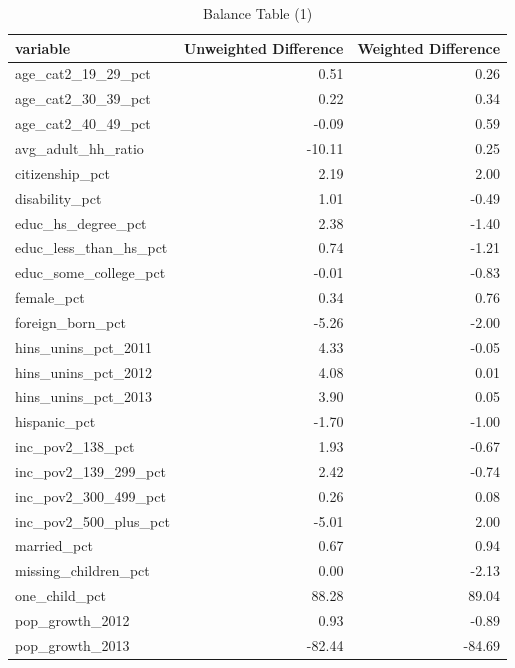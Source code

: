 \documentclass[12pt]{article}
\begin{document}
\begin{table}[ht]
\centering
\begin{tabular}{lrr}
  \hline
variable & Unweighted Difference & Weighted Difference \\ 
  \hline
age\_cat2\_19\_29\_pct & 0.51 & 0.26 \\ 
  age\_cat2\_30\_39\_pct & 0.22 & 0.34 \\ 
  age\_cat2\_40\_49\_pct & -0.09 & 0.59 \\ 
  avg\_adult\_hh\_ratio & -10.11 & 0.25 \\ 
  citizenship\_pct & 2.19 & 2.00 \\ 
  disability\_pct & 1.01 & -0.49 \\ 
  educ\_hs\_degree\_pct & 2.38 & -1.40 \\ 
  educ\_less\_than\_hs\_pct & 0.74 & -1.21 \\ 
  educ\_some\_college\_pct & -0.01 & -0.83 \\ 
  female\_pct & 0.34 & 0.76 \\ 
  foreign\_born\_pct & -5.26 & -2.00 \\ 
  hins\_unins\_pct\_2011 & 4.33 & -0.05 \\ 
  hins\_unins\_pct\_2012 & 4.08 & 0.01 \\ 
  hins\_unins\_pct\_2013 & 3.90 & 0.05 \\ 
  hispanic\_pct & -1.70 & -1.00 \\ 
  inc\_pov2\_138\_pct & 1.93 & -0.67 \\ 
  inc\_pov2\_139\_299\_pct & 2.42 & -0.74 \\ 
  inc\_pov2\_300\_499\_pct & 0.26 & 0.08 \\ 
  inc\_pov2\_500\_plus\_pct & -5.01 & 2.00 \\ 
  married\_pct & 0.67 & 0.94 \\ 
  missing\_children\_pct & 0.00 & -2.13 \\ 
  one\_child\_pct & 88.28 & 89.04 \\ 
  pop\_growth\_2012 & 0.93 & -0.89 \\ 
  pop\_growth\_2013 & -82.44 & -84.69 \\ 
   \hline
\end{tabular}
\caption{Balance Table (1)}
\label{baltab1}
\end{table}
\end{document}

